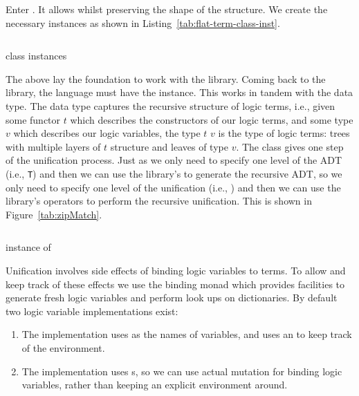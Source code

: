\documentclass[thesis-solanki.tex]{subfiles}
\begin{document}
Enter .
It allows  whilst preserving the shape of the structure.
We create the necessary instances
as shown in Listing~\ref{tab:flat-term-class-inst}.
\begin{code-list}[H]
  \begin{singlespace}
    \inputminted[linenos,lastline=12]{haskell}{haskell-proto1-class-flat.hs}
  \end{singlespace}
  \caption{\protect{} class instances}
  \label{tab:flat-term-class-inst}
\end{code-list}

The above lay the foundation to work with the library.
Coming back to the library, the language must have the  instance.
This works in tandem with the  data type.
The  data type captures the recursive structure of logic terms, i.e., given some functor
\(t\) which describes the constructors of our logic terms, and some type \(v\) which describes our logic variables,
the type  \(t\) \(v\) is the type of logic terms: trees with multiple layers of \(t\)
structure and leaves of type \(v\).
The  class gives one step of the unification process.
Just as we only need to specify one level of the ADT (i.e., \Verb!T!)
and then we can use the library's  to generate the recursive ADT, so we only need to
specify one level of the unification (i.e., ) and then we can use the library's
operators to perform the recursive unification.
This is shown in Figure~\ref{tab:zipMatch}.
\begin{code-list}[H]
  \begin{singlespace}
    \inputminted[linenos]{haskell}{haskell-proto1-zip-flat.hs}
  \end{singlespace}
  \vspace*{-0.5\baselineskip}
  \caption{\protect{} instance of \protect{}}
  \label{tab:zipMatch}
\end{code-list}

Unification involves side effects of binding logic variables to terms.
To allow and keep track of these effects we use the binding monad which provides facilities to generate fresh logic
variables and perform look ups on dictionaries.
By default two logic variable implementations exist:
\begin{enumerate}
\item
  The  implementation uses  as the names of variables, and uses an
   to keep track of the environment.

\item
  The  implementation uses s, so we can use actual mutation for
  binding logic variables, rather than keeping an explicit environment around.
\end{enumerate}
\end{document}
